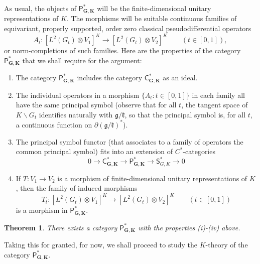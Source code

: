 \documentclass[leqno,11pt]{amsart}
\numberwithin{equation}{subsection}
\theoremstyle{plain}
\newtheorem{theorem}[equation]{Theorem}
\theoremstyle{definition}
\theoremstyle{remark}
\newcommand{\GG}{\pmb{G}}
\newcommand{\KK}{\pmb{K}}
\newcommand{\PSDO}{\mathsf{P}}
\newcommand{\CC}{\mathsf{C}}
\newcommand{\Symb}{\mathsf{S}}
\begin{document}
 As usual, the objects of $\PSDO^*_{\GG,\KK}$ will be the finite-dimensional unitary representations of $K$.  The morphisms will be suitable continuous families of equivariant, properly supported, order zero classical pseudodifferential operators 
\begin{equation}
    \label{eq-family-of-operators-on-fibers-of-dnc}
A_t \colon  [ L^2 (G_t)\otimes  V_1]^K \longrightarrow  [ L^2 (G_t)\otimes  V_2]^K\qquad (t\in [0,1]),
\end{equation}
or norm-completions of such families.  Here are the properties of the category $\PSDO^*_{\GG,\KK}$ that we shall require for the argument: 

\begin{enumerate}[\rm (i)]

\item The category $\PSDO^*_{\GG,\KK}$ includes the category $\CC^*_{\GG,\KK}$  as an ideal.

\item The individual  operators in a morphism $\{ A_t : t\in [0,1]\}$  in each family all have the same principal symbol (observe that for all $t$, the tangent space of $K \backslash G_t$ identifies naturally with $\mathfrak{g} / \mathfrak{k}$, so that the principal symbol is, for all $t$, a continuous function on $\partial( \mathfrak{g} / \mathfrak{k})^*$).

\item The principal symbol functor (that associates to a family of operators the common principal symbol) fits into an extension of $C^*$-categories
\[
0 \longrightarrow \CC^*_{\GG,\KK} \longrightarrow \PSDO^*_{\GG,\KK}\longrightarrow  \Symb^*_{G,K} \longrightarrow 0
\]

\item If $T\colon V_1 \to V_2$ is a morphism of finite-dimensional unitary representations of $K$, then the family of induced morphisms 
\[
T_t \colon [ L^2 (G_t)\otimes  V_1]^K  \longrightarrow [ L^2 (G_t)\otimes  V_2]^K  \qquad (t \in [0,1])
\]
is a morphism in $\PSDO^*_{\GG,\KK}$. 

\end{enumerate}

\begin{theorem}
\label{thm-existence-of-the-technical-c-star-category} 
There exists a category $\PSDO^*_{\GG,\KK}$ with the properties \textup{(i)-(iv)} above.    
\end{theorem}

Taking this for granted, for now, we shall proceed to study the $K$-theory of the category $\PSDO^*_{\GG,\KK}$. 
\end{document}
